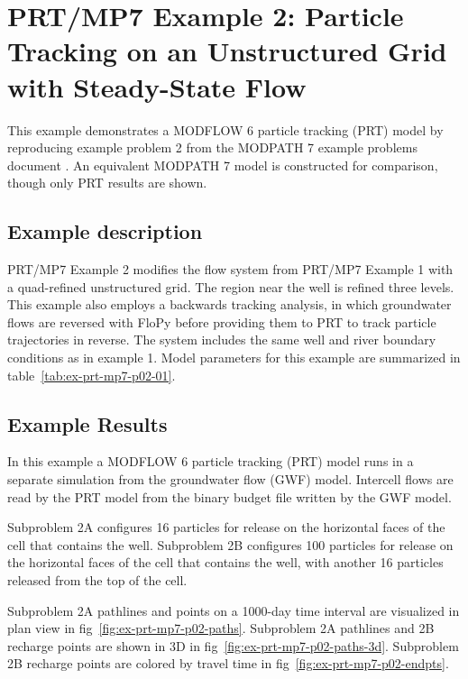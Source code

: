 \section{PRT/MP7 Example 2: Particle Tracking on an Unstructured Grid with Steady-State Flow}

This example demonstrates a MODFLOW 6 particle tracking (PRT) model by reproducing example problem 2 from the MODPATH 7 \citep{pollock2016modpath7} example problems document \citep{modpath7examples}. An equivalent MODPATH 7 model is constructed for comparison, though only PRT results are shown.

\subsection{Example description}

PRT/MP7 Example 2 modifies the flow system from PRT/MP7 Example 1 with a quad-refined unstructured grid. The region near the well is refined three levels. This example also employs a backwards tracking analysis, in which groundwater flows are reversed with FloPy before providing them to PRT to track particle trajectories in reverse. The system includes the same well and river boundary conditions as in example 1. Model parameters for this example are summarized in table~\ref{tab:ex-prt-mp7-p02-01}.



\subsection{Example Results}

In this example a MODFLOW 6 particle tracking (PRT) model runs in a separate simulation from the groundwater flow (GWF) model. Intercell flows are read by the PRT model from the binary budget file written by the GWF model.

Subproblem 2A configures 16 particles for release on the horizontal faces of the cell that contains the well. Subproblem 2B configures 100 particles for release on the horizontal faces of the cell that contains the well, with another 16 particles released from the top of the cell.

Subproblem 2A pathlines and points on a 1000-day time interval are visualized in plan view in fig~\ref{fig:ex-prt-mp7-p02-paths}. Subproblem 2A pathlines and 2B recharge points are shown in 3D in fig~\ref{fig:ex-prt-mp7-p02-paths-3d}. Subproblem 2B recharge points are colored by travel time in fig~\ref{fig:ex-prt-mp7-p02-endpts}.

